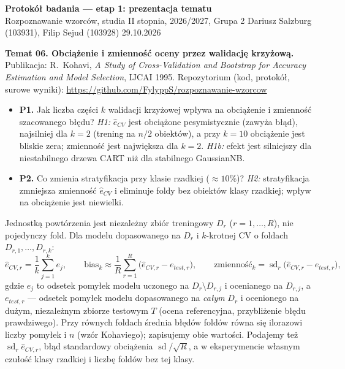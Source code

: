 \documentclass[10pt,a4paper]{article}
\newcommand{\repoURL}{https://github.com/FylyppS/rozpoznawanie-wzorcow}
\newcommand{\hd}[1]{\par\vspace{0.55em}{\normalsize\bfseries #1}\par\vspace{0.1em}}
\begin{document}
\small

{\large\bfseries Protokół badania --- etap 1: prezentacja tematu}\\
{\small Rozpoznawanie wzorców, studia II stopnia, 2026/2027, Grupa 2 \hfill Dariusz Salzburg (103931), Filip Sejud (103928) \hfill 29.10.2026}

\vspace{0.3em}
\textbf{Temat 06. Obciążenie i zmienność oceny przez walidację krzyżową.} Publikacja: R.~Kohavi,
\emph{A Study of Cross-Validation and Bootstrap for Accuracy Estimation and Model Selection}, IJCAI 1995.
Repozytorium (kod, protokół, surowe wyniki): \url{\repoURL}

\hd{1. Pytania badawcze i hipotezy}
\begin{itemize}
  \item \textbf{P1.} Jak liczba części $k$ walidacji krzyżowej wpływa na obciążenie i zmienność szacowanego błędu?
    \emph{H1:} $\hat e_{CV}$ jest obciążone pesymistycznie (zawyża błąd), najsilniej dla $k=2$ (trening na $n/2$ obiektów),
    a przy $k=10$ obciążenie jest bliskie zera; zmienność jest największa dla $k=2$.
    \emph{H1b:} efekt jest silniejszy dla niestabilnego drzewa CART niż dla stabilnego GaussianNB.
  \item \textbf{P2.} Co zmienia stratyfikacja przy klasie rzadkiej ($\approx 10\%$)? \emph{H2:} stratyfikacja zmniejsza
    zmienność $\hat e_{CV}$ i eliminuje foldy bez obiektów klasy rzadkiej; wpływ na obciążenie jest niewielki.
\end{itemize}

\hd{2. Wielkości mierzone}
Jednostką powtórzenia jest niezależny zbiór treningowy $D_r$ ($r=1,\dots,R$), nie pojedynczy fold.
Dla modelu dopasowanego na $D_r$ i $k$-krotnej CV o foldach $D_{r,1},\dots,D_{r,k}$:
\[
\hat e_{CV,r} = \frac{1}{k}\sum_{j=1}^{k} e_j, \qquad
\text{bias}_k \approx \frac{1}{R}\sum_{r=1}^{R}\bigl(\hat e_{CV,r} - e_{test,r}\bigr), \qquad
\text{zmienność}_k = \operatorname{sd}_r\bigl(\hat e_{CV,r} - e_{test,r}\bigr),
\]
gdzie $e_j$ to odsetek pomyłek modelu uczonego na $D_r\setminus D_{r,j}$ i ocenianego na $D_{r,j}$,
a $e_{test,r}$ --- odsetek pomyłek modelu dopasowanego na \emph{całym} $D_r$ i ocenionego na dużym, niezależnym
zbiorze testowym $T$ (ocena referencyjna, przybliżenie błędu prawdziwego). Przy równych foldach średnia błędów foldów
równa się ilorazowi liczby pomyłek i $n$ (wzór Kohaviego); zapisujemy obie wartości. Podajemy też $\operatorname{sd}_r \hat e_{CV,r}$,
błąd standardowy obciążenia $\operatorname{sd}/\sqrt{R}$, a w eksperymencie własnym czułość klasy rzadkiej i liczbę foldów bez tej klasy.
\end{document}
